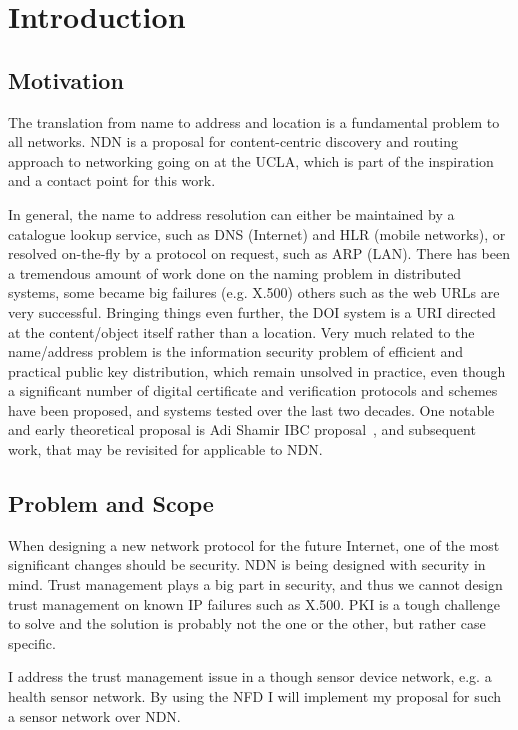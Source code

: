 \chapter{Introduction}\label{chp:introduction} 

\section{Motivation}
The translation from name to address and location is a fundamental problem to all networks.
\gls{NDN} is a proposal for content-centric discovery and routing approach to networking
going on at the \gls{UCLA}, which is part of the inspiration and a contact point for this work.

In general, the name to address resolution can either be maintained by a catalogue lookup service, 
such as \gls{DNS} (Internet) and \gls{HLR} (mobile networks), 
or resolved on-the-fly by a protocol on request, such as \gls{ARP} (\gls{LAN}). 
There has been a tremendous amount of work done on the naming problem in distributed systems, 
some became big failures (e.g. X.500) others such as the web \gls{URL}s are very successful. 
Bringing things even further, the \gls{DOI} system is a \gls{URI} directed at the content/object itself rather than a location. 
Very much related to the name/address problem is the information security problem of efficient and practical public key distribution, 
which remain unsolved in practice, even though a significant number of digital certificate and verification protocols and schemes have been proposed, and systems tested over the last two decades. 
One notable and early theoretical proposal is Adi Shamir \gls{IBC} proposal~\cite{DBLP:conf/crypto/Shamir84},
and subsequent work, that may be revisited for applicable to \gls{NDN}.

\section{Problem and Scope}

When designing a new network protocol for the future Internet, one of the most significant changes should be security.
\gls{NDN} is being designed with security in mind. 
Trust management plays a big part in security, and thus we cannot design trust management on known \gls{IP} failures such as X.500. 
\gls{PKI} is a tough challenge to solve and the solution is probably not the one or the other, but rather case specific.

I address the trust management issue in a though sensor device network, e.g. a health sensor network.
By using the \gls{NFD} I will implement my proposal for such a sensor network over \gls{NDN}.

